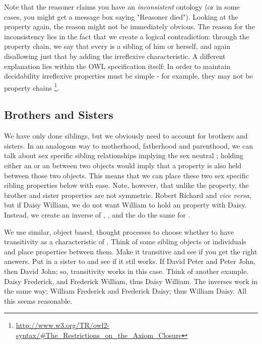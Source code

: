 
Note that the reasoner claims you have an \emph{inconsistent} ontology (or in some cases, you might get a message box saying "Reasoner died"). Looking at the  property again, the reason might not be immediately obvious.{\herebedragons} The reason for the inconsistency lies in the fact that we create a logical contradiction: through the property chain, we say that every \person is a sibling of him or herself, and again disallowing just that by adding the irreflexive characteristic. A different explanation lies within the OWL specification itself: In order to maintain decidability irreflexive properties must be simple - for example, they may not be property chains \footnote{\url{http://www.w3.org/TR/owl2-syntax/#The_Restrictions_on_the_Axiom_Closure}}.

\label{pg:irreflexive}

\subsection{Brothers and Sisters}

We have only done siblings, but we obviously need to account for brothers and sisters. In an analogous way to motherhood, fatherhood and parenthood, we can talk about sex specific sibling relationships implying the sex neutral ; holding either an  or an  between two objects would imply that a  property is also held between those two objects. This means that we can place these two sex specific sibling properties below  with ease. Note, however, that unlike the  property, the brother and sister properties are not symmetric. Robert  Richard and \emph{vice versa}, but if Daisy  William, we do not want William to hold an  property with Daisy. Instead, we create an inverse of , , and the do the same for . 

We use similar, object based, thought processes to choose whether to have transitivity as a characteristic of .
Think of some sibling objects or individuals and place  properties between them. Make it transitive and see if you get the right answers. Put in a sister to and see if it stil works. 
If David  Peter and Peter  John, then David  John; so, transitivity works in this case. Think of another example. Daisy  Frederick, and Frederick  William, thus Daisy  William. The inverses work in the same way;  William  Frederick and Frederick  Daisy; thus William  Daisy. All this seems reasonable.

